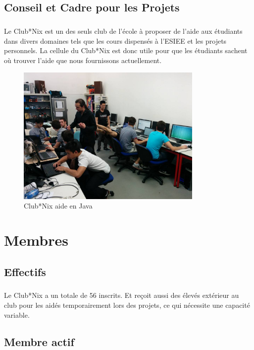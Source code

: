 \documentclass[11pt]{report}
\begin{document}
\section{Conseil et Cadre pour les Projets}
\paragraph{} Le Club*Nix est un des seuls club de l'école à proposer de l'aide
aux étudiants dans divers domaines tels que les cours dispensés à l'ESIEE et
les projets personnels. La cellule du Club*Nix est donc utile pour que les
étudiants sachent où trouver l'aide que nous fournissons actuellement.




\begin{figure}[h!]
	\centering
	\includegraphics[width=90mm]{res/java-tutoring.jpg}
	\caption{Club*Nix aide en Java}
\end{figure}

\chapter{Membres}

\section{Effectifs}

\paragraph{} Le Club*Nix a un totale de 56 inscrits. Et reçoit aussi des élevés extérieur au club pour les aidés temporairement lors des projets, ce qui nécessite une capacité variable.
\section{Membre actif}
\end{document}
